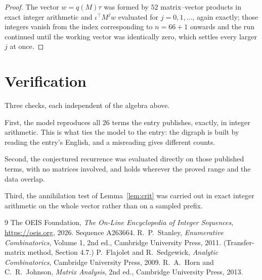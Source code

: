 \documentclass[11pt,a4paper]{article}
\theoremstyle{plain}
\theoremstyle{definition}
\begin{document}
\begin{proof}
The vector $w=q(M)\tau$ was formed by $52$ matrix--vector products in exact integer
arithmetic and $\iota^{\!\top}M^{j}w$ evaluated for $j=0,1,\dots$, again exactly; those
integers vanish from the index corresponding to $n=66+1$ onwards and the run continued
until the working vector was identically zero, which settles every larger $j$ at once.
\end{proof}

\section{Verification}

Three checks, each independent of the algebra above.

First, the model reproduces all $26$ terms the entry publishes, exactly, in integer
arithmetic. This is what ties the model to the entry: the digraph is built by reading the
entry's English, and a misreading gives different counts.

Second, the conjectured recurrence was evaluated directly on those published terms, with no
matrices involved, and holds wherever the proved range and the data overlap.

Third, the annihilation test of Lemma~\ref{lem:crit} was carried out in exact integer
arithmetic on the whole vector rather than on a sampled prefix.

\begin{thebibliography}{9}
 The OEIS Foundation, \emph{The On-Line Encyclopedia of Integer
Sequences}, \url{https://oeis.org}, 2026. Sequence A263664.
 R.~P.~Stanley, \emph{Enumerative Combinatorics}, Volume 1, 2nd ed.,
Cambridge University Press, 2011. (Transfer-matrix method, Section 4.7.)
 P.~Flajolet and R.~Sedgewick, \emph{Analytic Combinatorics}, Cambridge
University Press, 2009.
 R.~A.~Horn and C.~R.~Johnson, \emph{Matrix Analysis}, 2nd ed., Cambridge
University Press, 2013.
\end{thebibliography}
\end{document}
